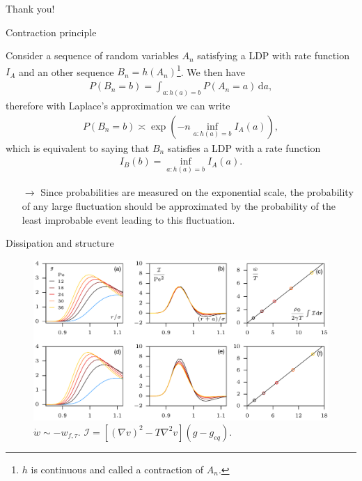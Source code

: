 \documentclass{beamer}
\begin{document}

{
\footerwithoutframenumber
\begin{frame}[noframenumbering]

\begin{center}
\Huge
Thank you!
\end{center}

\end{frame}
}


{
\footerwithoutframenumber

\begin{frame}[noframenumbering]{Contraction principle}

Consider a sequence of random variables $A_n$ satisfying a LDP with rate function $I_A$ and an other sequence $B_n = h(A_n)$\footnote{$h$ is continuous and called a contraction of $A_n$.}. We then have
\begin{align*}
  P(B_n = b) = \int_{a:h(a) = b} P(A_n = a) \, \text{d}a,
\end{align*}
therefore with Laplace's approximation we can write
\begin{align*}
  P(B_n = b) \asymp \exp\left(-n \inf_{a:h(a) = b} I_A(a)\right),
\end{align*}
which is equivalent to saying that $B_n$ satisfies a LDP with a rate function
\begin{align*}
  I_B(b) = \inf_{a:h(a) = b} I_A(a).
\end{align*}

\return
\begin{itemize}
  \item[$\rightarrow$] Since probabilities are measured on the exponential scale, the probability of any large fluctuation should be approximated by the probability of the least improbable event leading to this fluctuation.
\end{itemize}

\end{frame}

\begin{frame}[noframenumbering]{Dissipation and structure}

\begin{figure}
\centering
\includegraphics[width=\textwidth]{Tociu_2019_fig4.png}{}
\caption{$\dot{w} \sim -w_{f, \tau}$. $\mathcal{I} = [(\nabla v)^2 - T\nabla^2 v](g - g_{eq})$. }
\end{figure}


\end{frame}}
\end{document}

